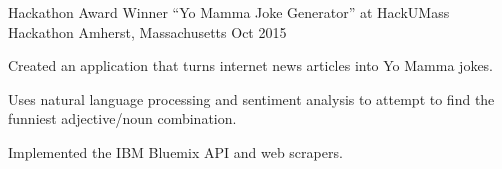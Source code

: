 \begin{cventries}
  \cventry
    {Hackathon Award Winner}
    {“Yo Mamma Joke Generator” at HackUMass Hackathon}
    {Amherst, Massachusetts}
    {Oct 2015}
    {
      \begin{cvitems}
        \item {Created an application that turns internet news articles into Yo Mamma jokes.}
        \item {Uses natural language processing and sentiment analysis to attempt to find the funniest adjective/noun combination.} 
        \item {Implemented the IBM Bluemix API and web scrapers.}
      \end{cvitems}
    }
\end{cventries}

